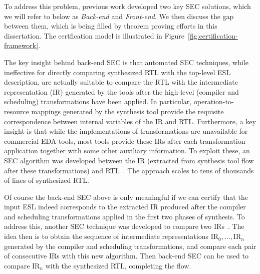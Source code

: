 To address this problem, previous work developed two key SEC
solutions, which we will refer to below as {\em Back-end} and {\em
Front-end}.  We then discuss the gap between them, which is being
filled by theorem proving efforts in this dissertation. The certfication model 
is illustrated in Figure~\ref{fig:certification-framework}.
\medskip

 The key insight behind
back-end SEC is that automated SEC techniques, while
ineffective for directly comparing synthesized RTL with the
top-level ESL description, are actually suitable to compare
the RTL with the intermediate representation (IR) generated
by the tools after the high-level (compiler and scheduling)
transformations have been applied.  In particular,
operation-to-resource mappings generated by the synthesis
tool provide the requisite correspondence between internal
variables of the IR and RTL.  Furthermore, a key insight is
that while the implementations of transformations are
unavailable for commercial EDA tools, most tools provide
these IRs after each transformation application together
with some other auxiliary information.  To exploit these, an
SEC algorithm was developed between the IR (extracted from
synthesis tool flow after these transformations) and
RTL~\cite{rhcxy:atva-09,hxry:date-10,kechengthesis,Yang2013}. 
The approach scales
to tens of thousands of lines of synthesized RTL.

\medskip

 Of course the back-end SEC
above is only meaningful if we can certify that the input
ESL indeed corresponds to the extracted IR produced after
the compiler and scheduling transformations applied in the
first two phases of synthesis. To address this, another SEC
technique was developed to compare two IRs~\cite{zhenkun:iccd-13,zhenkun2,zhenkun3}.  The idea then
is to obtain the sequence of intermediate representations
$\mbox{IR}_0,\ldots,\mbox{IR}_n$ generated by the compiler
and scheduling transformations, and compare each pair of
consecutive IRs with this new algorithm.  Then back-end SEC
can be used to compare $\mbox{IR}_n$ with the synthesized
RTL, completing the flow.

\bigskip

